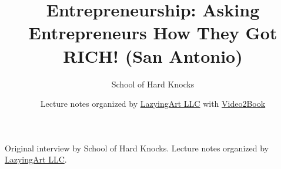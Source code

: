 \documentclass[11pt,oneside]{book}
\begin{document}
\frontmatter
\title{Entrepreneurship: Asking Entrepreneurs How They Got RICH! (San Antonio)}
\author{School of Hard Knocks}
\date{Lecture notes organized by \href{https://lazying.art}{LazyingArt LLC} with \href{https://github.com/lachlanchen/Video2Book}{Video2Book}}
\maketitle
\begin{center}
\small Original interview by School of Hard Knocks. Lecture notes organized by \href{https://lazying.art}{LazyingArt LLC}.
\end{center}
\clearpage
\mainmatter

\end{document}
